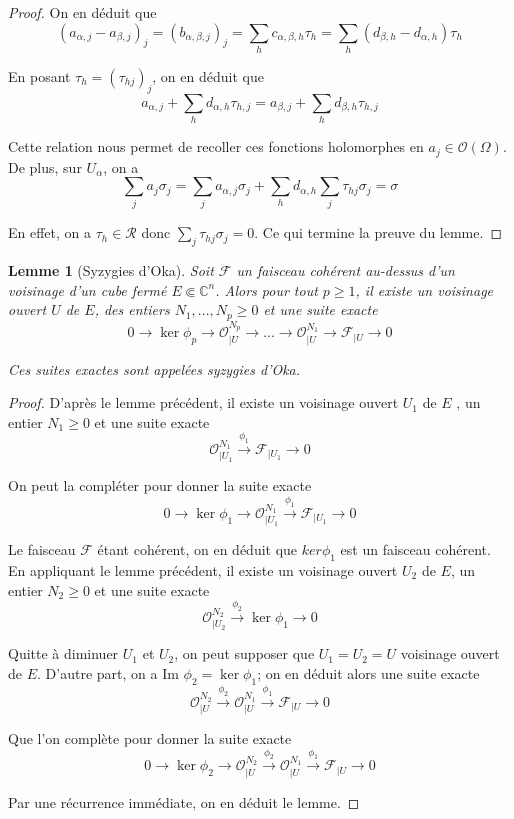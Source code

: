 \documentclass{article}
\newtheorem{lemme}[theoreme]{Lemme}
\theoremstyle{definition}
\theoremstyle{remarque}
\begin{document}
\begin{proof}
On en déduit que $$(a_{\alpha,j} - a_{\beta,j})_j = (b_{\alpha,\beta,j})_j = \sum_h c_{\alpha,\beta,h}\tau_h = \sum_h (d_{\beta, h} - d_{\alpha,h})\tau_h$$

En posant $\tau_h = (\tau_{hj})_j$, on en déduit que
$$a_{\alpha,j} + \sum_h d_{\alpha,h}\tau_{h, j} = a_{\beta,j} + \sum_h d_{\beta,h}\tau_{h, j}$$

Cette relation nous permet de recoller ces fonctions holomorphes en $a_j \in \mathcal{O}(\Omega)$. De plus, sur $U_\alpha$, on a
$$\sum_j a_j\sigma_j = \sum_j a_{\alpha,j}\sigma_j + \sum_h d_{\alpha,h}\sum_j \tau_{hj}\sigma_j = \sigma$$

En effet, on a $\tau_h \in \mathcal{R}$ donc $\sum_j \tau_{hj}\sigma_j = 0$. Ce qui termine la preuve du lemme.
\end{proof}

\begin{lemme}[Syzygies d'Oka]
Soit $\mathcal{F}$ un faisceau cohérent au-dessus d'un voisinage d'un cube fermé $E \Subset \mathbb{C}^n$. Alors pour tout $p \geq 1$, il existe un voisinage ouvert $U$ de $E$, des entiers $N_1,...,N_p \geq 0$ et une suite exacte
$$0 \to \ker \phi_p \to \mathcal{O}^{N_p}_{|U} \to ... \to \mathcal{O}^{N_1}_{|U} \to \mathcal{F}_{|U} \to 0$$

Ces suites exactes sont appelées syzygies d'Oka.
\end{lemme}

\begin{proof}
D'après le lemme précédent, il existe un voisinage ouvert $U_1$ de $E$ , un entier $N_1 \geq 0$ et une suite exacte
$$\mathcal{O}^{N_1}_{|U_1} \overset{\phi_1}{\to} \mathcal{F}_{|U_1} \to 0$$

On peut la compléter pour donner la suite exacte
$$0 \to \ker \phi_1 \to \mathcal{O}^{N_1}_{|U_1} \overset{\phi_1}{\to} \mathcal{F}_{|U_1} \to 0$$

Le faisceau $\mathcal{F}$ étant cohérent, on en déduit que $ker \phi_1$ est un faisceau cohérent. En appliquant le lemme précédent, il existe un voisinage ouvert $U_2$ de $E$, un entier $N_2 \geq 0$ et une suite exacte
$$\mathcal{O}^{N_2}_{|U_2} \overset{\phi_2}{\to} \ker \phi_1 \to 0$$

Quitte à diminuer $U_1$ et $U_2$, on peut supposer que $U_1 = U_2 = U$ voisinage ouvert de $E$. D'autre part, on a Im $\phi_2 = \ker \phi_1$; on en déduit alors une suite exacte
$$\mathcal{O}^{N_2}_{|U} \overset{\phi_2}{\to} \mathcal{O}^{N_1}_{|U} \overset{\phi_1}{\to} \mathcal{F}_{|U} \to 0$$

Que l'on complète pour donner la suite exacte
$$0 \to \ker \phi_2 \to \mathcal{O}^{N_2}_{|U} \overset{\phi_2}{\to} \mathcal{O}^{N_1}_{|U} \overset{\phi_1}{\to} \mathcal{F}_{|U} \to 0$$

Par une récurrence immédiate, on en déduit le lemme.
\end{proof}
\end{document}
